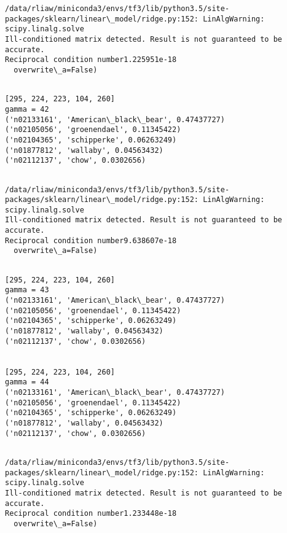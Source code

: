 \documentclass[11pt]{article}
\begin{document}
    \begin{Verbatim}[commandchars=\\\{\}]
/data/rliaw/miniconda3/envs/tf3/lib/python3.5/site-packages/sklearn/linear\_model/ridge.py:152: LinAlgWarning: scipy.linalg.solve
Ill-conditioned matrix detected. Result is not guaranteed to be accurate.
Reciprocal condition number1.225951e-18
  overwrite\_a=False)

    \end{Verbatim}

    \begin{Verbatim}[commandchars=\\\{\}]

[295, 224, 223, 104, 260]
gamma = 42
('n02133161', 'American\_black\_bear', 0.47437727)
('n02105056', 'groenendael', 0.11345422)
('n02104365', 'schipperke', 0.06263249)
('n01877812', 'wallaby', 0.04563432)
('n02112137', 'chow', 0.0302656)


    \end{Verbatim}

    \begin{Verbatim}[commandchars=\\\{\}]
/data/rliaw/miniconda3/envs/tf3/lib/python3.5/site-packages/sklearn/linear\_model/ridge.py:152: LinAlgWarning: scipy.linalg.solve
Ill-conditioned matrix detected. Result is not guaranteed to be accurate.
Reciprocal condition number9.638607e-18
  overwrite\_a=False)

    \end{Verbatim}

    \begin{Verbatim}[commandchars=\\\{\}]

[295, 224, 223, 104, 260]
gamma = 43
('n02133161', 'American\_black\_bear', 0.47437727)
('n02105056', 'groenendael', 0.11345422)
('n02104365', 'schipperke', 0.06263249)
('n01877812', 'wallaby', 0.04563432)
('n02112137', 'chow', 0.0302656)


[295, 224, 223, 104, 260]
gamma = 44
('n02133161', 'American\_black\_bear', 0.47437727)
('n02105056', 'groenendael', 0.11345422)
('n02104365', 'schipperke', 0.06263249)
('n01877812', 'wallaby', 0.04563432)
('n02112137', 'chow', 0.0302656)


    \end{Verbatim}

    \begin{Verbatim}[commandchars=\\\{\}]
/data/rliaw/miniconda3/envs/tf3/lib/python3.5/site-packages/sklearn/linear\_model/ridge.py:152: LinAlgWarning: scipy.linalg.solve
Ill-conditioned matrix detected. Result is not guaranteed to be accurate.
Reciprocal condition number1.233448e-18
  overwrite\_a=False)

    \end{Verbatim}
\end{document}
